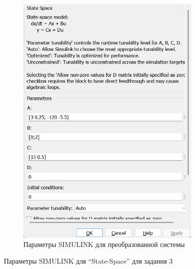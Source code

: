 \documentclass[a4paper, 12pt]{article}
\begin{document}
\begin{figure}[H]
\begin{subfigure}{0.3\textwidth}
            \includegraphics[width=\linewidth]{new_model_3_window.png}
            \caption{Параметры SIMULINK для преобразованной системы}
            \label{fig:nm3w}
        \end{subfigure}
        \caption{Параметры SIMULINK для ``State-Space'' для задания 3}
        \label{fig:windows3}
    \end{figure}
\end{document}
